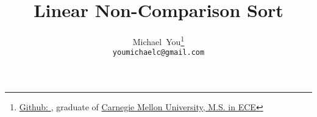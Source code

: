 \usepackage{arxiv}
\usepackage{util}

\usepackage[utf8]{inputenc} %
\usepackage[T1]{fontenc}    %
\usepackage{hyperref}       %
\usepackage{url}            %
\usepackage{booktabs}       %
\usepackage{amsfonts}       %
\usepackage{nicefrac}       %
\usepackage{microtype}      %
\usepackage{lipsum}		%
\usepackage{graphicx}
\usepackage{natbib}
\usepackage{doi}

\title{Linear Non-Comparison Sort}

\author{
  Michael~You\thanks{\href{https://github.com/mikinty}{Github: }, graduate of \href{https://www.cmu.edu/}{Carnegie Mellon University, M.S. in ECE}} \\
  \texttt{youmichaelc@gmail.com}
}

\renewcommand{\headeright}{Michael You}
\renewcommand{\undertitle}{}
\renewcommand{\shorttitle}{Parallel Non-Comparison Hardware Sort}


\newcommand{\findLargest}{\te{FIND\_LARGEST\_NUMBER}}